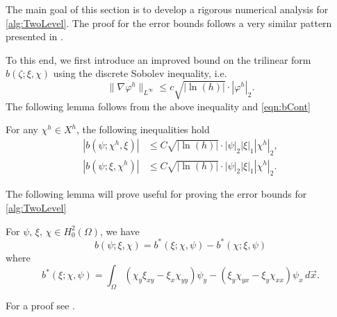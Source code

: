 The main goal of this section is to develop a rigorous numerical analysis for
\autoref{alg:TwoLevel}. The proof for the error bounds follows a very similar
pattern presented in \cite{Fairag98}.

To this end, we first introduce an improved bound on the trilinear form
$b(\zeta; \xi, \chi)$ using the discrete Sobolev inequality, i.e.
\begin{equation*}
  \|\nabla \varphi^h\|_{L^{\infty}} \le c \sqrt{|\ln(h)|}\cdot |\varphi^h|_2.
\end{equation*}
The following lemma follows from the above inequality and \eqref{eqn:bCont} %
\begin{lemma} \label{lma:bImproved}
  For any $\chi^h\in X^h$, the following inequalities hold
  \begin{align*}
    |b(\psi;\chi^h,\xi)| &\le C\sqrt{|\ln(h)|} \cdot |\psi|_2 |\xi|_1 |\chi^h|_2, \\
    |b(\psi;\xi,\chi^h)| &\le C\sqrt{|\ln(h)|} \cdot |\psi|_2 |\xi|_1 |\chi^h|_2.
  \end{align*}
\end{lemma}
The following lemma will prove useful for proving the error bounds for
\autoref{alg:TwoLevel}
\begin{lemma} \label{lma:trilinear}
  For $\psi,\,\xi,\,\chi\in H^2_0(\Omega)$, we have
  \begin{equation}
    b(\psi; \xi, \chi) = b^*(\xi; \chi, \psi) - b^*(\chi; \xi, \psi)
    \label{eqn:eqn:trilinear}
  \end{equation}
  where
  \begin{equation}
    b^*(\xi; \chi, \psi) = \int_{\Omega}\! (\chi_y\xi_{xy}-\xi_x\chi_{yy}) \psi_y -
    (\xi_y\chi_{yx}-\xi_y\chi_{xx}) \psi_x \,d\vec{x}.
    \label{eqn:trilinear}
  \end{equation}
\end{lemma}
For a proof see \cite{Fairag98}.


